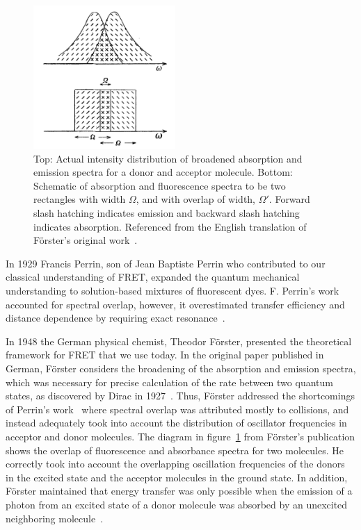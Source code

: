 \begin{figure}
    \centering
    \includegraphics[width=0.48\textwidth]{chapters/figures/spectral_overlap.jpg}
    \caption{\label{fig:spectral_overlap}
    Top: Actual intensity distribution of broadened absorption and emission spectra for a donor and acceptor molecule.
    Bottom: Schematic of absorption and fluorescence spectra to be two rectangles with width $\Omega$, and with overlap of width, $\Omega'$.
    Forward slash hatching indicates emission and backward slash hatching indicates absorption.
    Referenced from the English translation of F{\"o}rster's original work~\cite{forster_1948,forster_english_1948}.
    }
\end{figure}

In 1929 Francis Perrin, son of Jean Baptiste Perrin who contributed to our classical understanding of FRET, expanded the quantum mechanical understanding to solution-based mixtures of fluorescent dyes. 
F. Perrin's work accounted for spectral overlap, however, it overestimated transfer efficiency and distance dependence by requiring exact resonance~\cite{clegg_history, forster_1948}.

In 1948 the German physical chemist, Theodor F{\"o}rster,
presented the theoretical framework for FRET that we use today. 
In the original paper published in German, F{\"o}rster considers the broadening of the absorption and emission spectra, which was necessary for precise calculation of the rate between two quantum states, as discovered by Dirac in 1927~\cite{clegg_history}.
Thus, F{\"o}rster addressed the shortcomings of Perrin's work~\cite{forster_1948} where spectral overlap was attributed mostly to collisions, and instead adequately took into account the distribution of oscillator frequencies in acceptor and donor molecules. 
The diagram in figure~\ref{fig:spectral_overlap} from F{\"o}rster's publication shows the overlap of fluorescence and absorbance spectra for two molecules.
He correctly took into account the overlapping oscillation frequencies of the donors in the excited state and the acceptor molecules in the ground state.
In addition, F{\"o}rster maintained that energy transfer was only possible when the emission of a photon from an excited state of a donor molecule was absorbed by an unexcited neighboring molecule~\cite{forster_1948, forster_english_1948}. 

